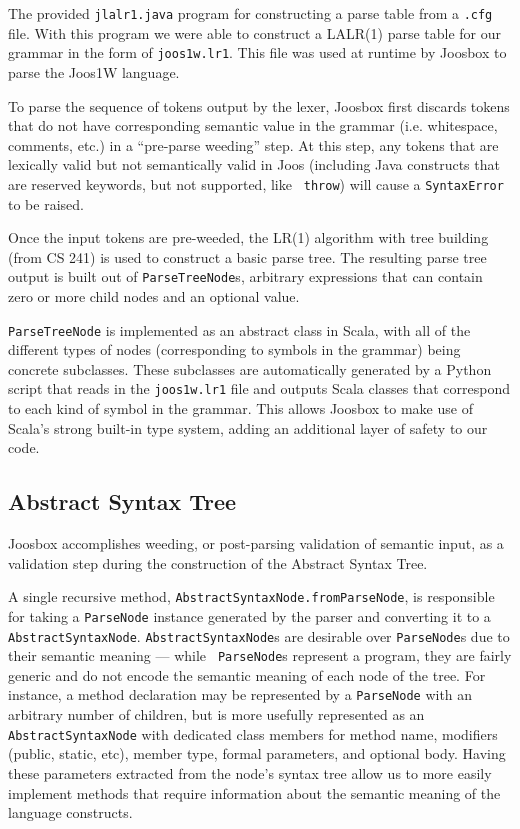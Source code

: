 \documentclass[letterpaper]{article}
\begin{document}
  The provided {\tt jlalr1.java} program for constructing a parse table from a
  {\tt.cfg} file. With this program we were able to construct a LALR(1) parse
  table for our grammar in the form of {\tt joos1w.lr1}. This file was used at
  runtime by Joosbox to parse the Joos1W language.

  To parse the sequence of tokens output by the lexer, Joosbox first discards
  tokens that do not have corresponding semantic value in the grammar (i.e.
  whitespace, comments, etc.) in a ``pre-parse weeding'' step. At this step, any
  tokens that are lexically valid but not semantically valid in Joos (including
  Java constructs that are reserved keywords, but not supported, like {\tt
  throw}) will cause a {\tt SyntaxError} to be raised.

  Once the input tokens are pre-weeded, the LR(1) algorithm with tree building
  (from CS 241) is used to construct a basic parse tree. The resulting parse
  tree output is built out of {\tt ParseTreeNode}s, arbitrary expressions that
  can contain zero or more child nodes and an optional value.

  {\tt ParseTreeNode} is implemented as an abstract class in Scala, with all of
  the different types of nodes (corresponding to symbols in the grammar) being
  concrete subclasses. These subclasses are automatically generated by a Python
  script that reads in the {\tt joos1w.lr1} file and outputs Scala classes that
  correspond to each kind of symbol in the grammar. This allows Joosbox to make
  use of Scala's strong built-in type system, adding an additional layer of
  safety to our code.

  \subsection{Abstract Syntax Tree}

  Joosbox accomplishes weeding, or post-parsing validation of semantic input, as
  a validation step during the construction of the Abstract Syntax Tree.

  A single recursive method, {\tt AbstractSyntaxNode.fromParseNode}, is
  responsible for taking a {\tt ParseNode} instance generated by the parser and
  converting it to a {\tt AbstractSyntaxNode}. {\tt AbstractSyntaxNode}s are
  desirable over {\tt ParseNode}s due to their semantic meaning --- while {\tt
  ParseNode}s represent a program, they are fairly generic and do not encode the
  semantic meaning of each node of the tree. For instance, a method declaration
  may be represented by a {\tt ParseNode} with an arbitrary number of children,
  but is more usefully represented as an {\tt AbstractSyntaxNode} with dedicated
  class members for method name, modifiers (public, static, etc), member type,
  formal parameters, and optional body. Having these parameters extracted from
  the node's syntax tree allow us to more easily implement methods that require
  information about the semantic meaning of the language constructs.
\end{document}
